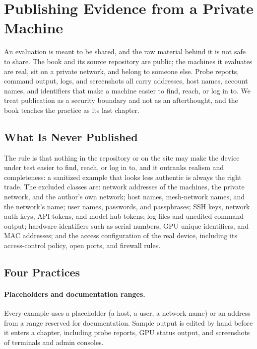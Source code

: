 \section{Publishing Evidence from a Private Machine}
\label{sec:publishing}

An evaluation is meant to be shared, and the raw material behind it is not safe to share. The book and its source repository are public; the machines it evaluates are real, sit on a private network, and belong to someone else. Probe reports, command output, logs, and screenshots all carry addresses, host names, account names, and identifiers that make a machine easier to find, reach, or log in to. We treat publication as a security boundary and not as an afterthought, and the book teaches the practice as its last chapter.

\subsection{What Is Never Published}

The rule is that nothing in the repository or on the site may make the device under test easier to find, reach, or log in to, and it outranks realism and completeness: a sanitized example that looks less authentic is always the right trade. The excluded classes are: network addresses of the machines, the private network, and the author's own network; host names, mesh-network names, and the network's name; user names, passwords, and passphrases; SSH keys, network auth keys, API tokens, and model-hub tokens; log files and unedited command output; hardware identifiers such as serial numbers, GPU unique identifiers, and MAC addresses; and the access configuration of the real device, including its access-control policy, open ports, and firewall rules.

\subsection{Four Practices}

\paragraph{Placeholders and documentation ranges.}
Every example uses a placeholder (a host, a user, a network name) or an address from a range reserved for documentation. Sample output is edited by hand before it enters a chapter, including probe reports, GPU status output, and screenshots of terminals and admin consoles.

